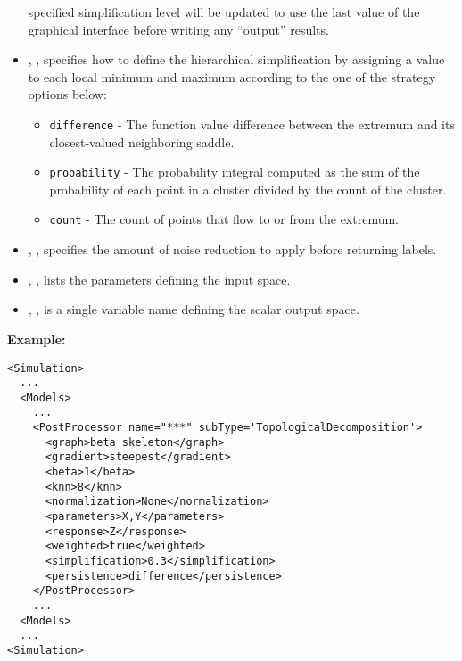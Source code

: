 \begin{itemize}
  specified simplification level will be updated to use the last value of the
  graphical interface before writing any ``output'' results.
  \item {}, , specifies how
  to define the hierarchical simplification by assigning a value to each local
  minimum and maximum according to the one of the strategy options below:
  \begin{itemize}
    \item \texttt{difference} - The function value difference between the
    extremum and its closest-valued neighboring saddle.
    \item \texttt{probability} - The probability integral computed as the
    sum of the probability of each point in a cluster divided by the count of
    the cluster.
    \item \texttt{count} - The count of points that flow to or from the
    extremum.
  \end{itemize}
  \item {}, , specifies the
  amount of noise reduction to apply before returning labels.
  \item {}, ,
  lists the parameters defining the input space.
  \item {}, , is a single
  variable name defining the scalar output space.
\end{itemize}
\textbf{Example:}
\begin{lstlisting}[style=XML,morekeywords={subType}]
<Simulation>
  ...
  <Models>
    ...
    <PostProcessor name="***" subType='TopologicalDecomposition'>
      <graph>beta skeleton</graph>
      <gradient>steepest</gradient>
      <beta>1</beta>
      <knn>8</knn>
      <normalization>None</normalization>
      <parameters>X,Y</parameters>
      <response>Z</response>
      <weighted>true</weighted>
      <simplification>0.3</simplification>
      <persistence>difference</persistence>
    </PostProcessor>
    ...
  <Models>
  ...
<Simulation>
\end{lstlisting}



%

